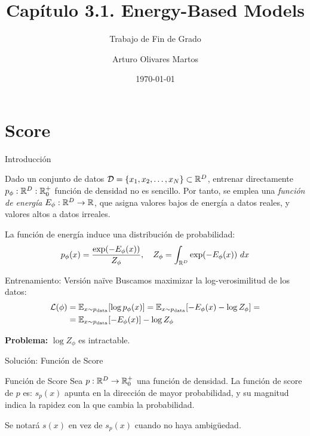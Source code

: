 \documentclass{beamer}
\title[3.1. EBM]{Capítulo 3.1. Energy-Based Models}
\subtitle{Trabajo de Fin de Grado}
\author[Arturo]{Arturo Olivares Martos}
\institute[DGIIM - UGR]{Doble Grado en Ingeniería Informática y Matemáticas\\Universidad de Granada}
\date{\today}
\begin{document}
\begin{frame}
    \titlepage
\end{frame}

\section{Score}
\begin{frame}{Introducción}

    Dado un conjunto de datos $\mathcal{D} = \{x_1, x_2, \ldots, x_N\}\subset \mathbb{R}^D$, entrenar directamente $p_\phi:\mathbb{R}^D:\mathbb{R}^+_0$ función de densidad no es sencillo. Por tanto, se emplea una \emph{función de energía} $E_\phi:\mathbb{R}^D\to \mathbb{R}$, que asigna valores bajos de energía a datos reales, y valores altos a datos irreales.

    \pause
    La función de energía induce una distribución de probabilidad:
    \begin{equation*}
        p_\phi(x) = \frac{\exp(-E_\phi(x))}{Z_\phi}, \quad Z_\phi = \int_{\mathbb{R}^D} \exp(-E_\phi(x))\ dx
    \end{equation*}
\end{frame}

\begin{frame}{Entrenamiento: Versión naïve}
    Buscamos maximizar la log-verosimilitud de los datos:
    \begin{align*}
        \mathcal{L}(\phi) &= \mathbb{E}_{x\sim p_\text{data}}[\log p_\phi(x)] = \mathbb{E}_{x\sim p_\text{data}}[-E_\phi(x) - \log Z_\phi]
        = \\&=\mathbb{E}_{x\sim p_\text{data}}[-E_\phi(x)] - \log Z_\phi
    \end{align*}
    \pause
    \begin{center}
        \color{red} \textbf{Problema:} $\log Z_\phi$ es intractable.
    \end{center}
\end{frame}

\begin{frame}{Solución: Función de Score}
    \begin{definitionblock}{Función de Score}
        Sea $p:\mathbb{R}^D\to \mathbb{R}^+_0$ una función de densidad. La función de score de $p$ es:
        \pause
        $s_p(x)$ apunta en la dirección de mayor probabilidad, y su magnitud indica la rapidez con la que cambia la probabilidad.
    \end{definitionblock}

    \pause
    Se notará $s(x)$ en vez de $s_p(x)$ cuando no haya ambigüedad.
\end{frame}
\end{document}
